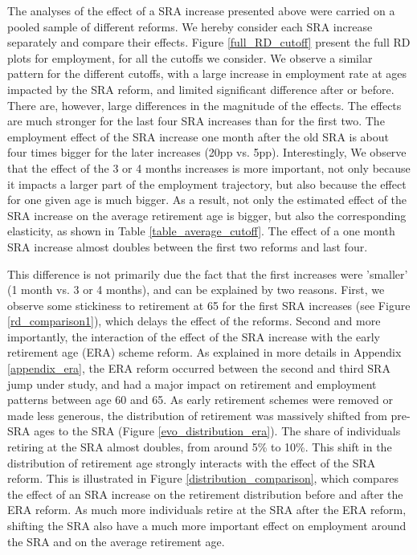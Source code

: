 \documentclass[12pt,a4paper]{article}
\begin{document}
The analyses of the effect of a SRA increase presented above were carried on a pooled sample of different reforms. We hereby consider each SRA increase separately and compare their effects. Figure \ref{full_RD_cutoff} present the full RD plots for employment, for all the cutoffs we consider. We observe a similar pattern for the different cutoffs, with a large increase in employment rate at ages impacted by the SRA reform, and limited significant difference after or before. There are, however, large differences in the magnitude of the effects. The effects are much stronger for the last four SRA increases than for the first two. The employment effect of the SRA increase one month after the old SRA is about four times bigger for the later increases (20pp vs. 5pp).
Interestingly, We observe that the effect of the 3 or 4 months increases is more important, not only because it impacts a larger part of the employment trajectory, but also because the effect for one given age is much bigger. As a result, not only the estimated effect of the SRA increase on the average retirement age is bigger, but also the corresponding elasticity, as shown in Table \ref{table_average_cutoff}. The effect of a one month SRA increase almost doubles between the first two reforms and last four. 

This difference is not primarily due the fact that the first increases were 'smaller' (1 month vs. 3 or 4 months), and can be explained by two reasons. First, we observe some stickiness to retirement at 65 for the first SRA increases (see Figure \ref{rd_comparison1}), which delays the effect of the reforms. Second and more importantly, the interaction of the effect of the SRA increase with the early retirement age (ERA) scheme reform. As explained in more details in Appendix \ref{appendix_era}, the ERA reform occurred between the second and third SRA jump under study, and had a major impact on retirement and employment patterns between age 60 and 65. As early retirement schemes were removed or made less generous, the distribution of retirement was massively shifted from pre-SRA ages to the SRA (Figure \ref{evo_distribution_era}). The share of individuals retiring at the SRA almost doubles, from around 5\% to 10\%. This shift in the distribution of retirement age strongly interacts with the effect of the SRA reform. This is illustrated in Figure \ref{distribution_comparison}, which compares the effect of an SRA increase on the retirement distribution before and after the ERA reform. As much more individuals retire at the SRA after the ERA reform, shifting the SRA also have a much more important effect on employment around the SRA and on the average retirement age. 
\end{document}
